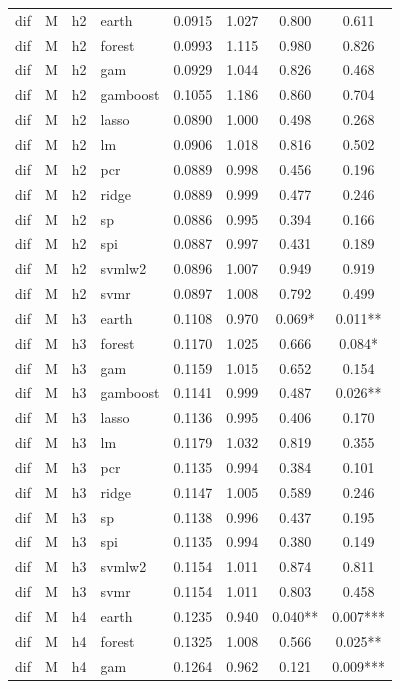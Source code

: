\begin{ThreePartTable}
\begin{longtable}[t]{llclcccc}
\addlinespace
dif & M & h2 & earth & 0.0915 & 1.027 & 0.800 & 0.611\\
dif & M & h2 & forest & 0.0993 & 1.115 & 0.980 & 0.826\\
dif & M & h2 & gam & 0.0929 & 1.044 & 0.826 & 0.468\\
dif & M & h2 & gamboost & 0.1055 & 1.186 & 0.860 & 0.704\\
dif & M & h2 & lasso & 0.0890 & 1.000 & 0.498 & 0.268\\
dif & M & h2 & lm & 0.0906 & 1.018 & 0.816 & 0.502\\
dif & M & h2 & pcr & 0.0889 & 0.998 & 0.456 & 0.196\\
dif & M & h2 & ridge & 0.0889 & 0.999 & 0.477 & 0.246\\
dif & M & h2 & sp & 0.0886 & 0.995 & 0.394 & 0.166\\
dif & M & h2 & spi & 0.0887 & 0.997 & 0.431 & 0.189\\
dif & M & h2 & svmlw2 & 0.0896 & 1.007 & 0.949 & 0.919\\
dif & M & h2 & svmr & 0.0897 & 1.008 & 0.792 & 0.499\\
\addlinespace
dif & M & h3 & earth & 0.1108 & 0.970 & 0.069* & 0.011**\\
dif & M & h3 & forest & 0.1170 & 1.025 & 0.666 & 0.084*\\
dif & M & h3 & gam & 0.1159 & 1.015 & 0.652 & 0.154\\
dif & M & h3 & gamboost & 0.1141 & 0.999 & 0.487 & 0.026**\\
dif & M & h3 & lasso & 0.1136 & 0.995 & 0.406 & 0.170\\
dif & M & h3 & lm & 0.1179 & 1.032 & 0.819 & 0.355\\
dif & M & h3 & pcr & 0.1135 & 0.994 & 0.384 & 0.101\\
dif & M & h3 & ridge & 0.1147 & 1.005 & 0.589 & 0.246\\
dif & M & h3 & sp & 0.1138 & 0.996 & 0.437 & 0.195\\
dif & M & h3 & spi & 0.1135 & 0.994 & 0.380 & 0.149\\
dif & M & h3 & svmlw2 & 0.1154 & 1.011 & 0.874 & 0.811\\
dif & M & h3 & svmr & 0.1154 & 1.011 & 0.803 & 0.458\\
\addlinespace
dif & M & h4 & earth & 0.1235 & 0.940 & 0.040** & 0.007***\\
dif & M & h4 & forest & 0.1325 & 1.008 & 0.566 & 0.025**\\
dif & M & h4 & gam & 0.1264 & 0.962 & 0.121 & 0.009***\\

\end{longtable}
\end{ThreePartTable}
